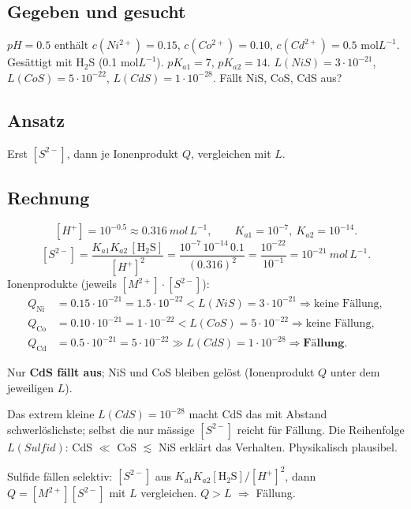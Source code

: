 
\subsection*{Gegeben und gesucht}
$pH=0.5$ enthält $c(Ni^{2+})=0.15$, $c(Co^{2+})=0.10$, $c(Cd^{2+})=0.5$
mol$L^{-1}$. Gesättigt mit H$_2$S (0.1 mol$L^{-1}$).
$pK_{a1}=7$, $pK_{a2}=14$. $L(NiS)=3\cdot10^{-21}$, $L(CoS)=5\cdot10^{-22}$,
$L(CdS)=1\cdot10^{-28}$. Fällt NiS, CoS, CdS aus?

\subsection*{Ansatz}
Erst $[S^{2-}]$, dann je Ionenprodukt $Q$, vergleichen mit $L$.

\subsection*{Rechnung}
\[
  [H^+] = 10^{-0.5} \approx 0.316\ mol\,L^{-1},\qquad
  K_{a1}=10^{-7},\ K_{a2}=10^{-14}.
\]
\[
  [S^{2-}] = \frac{K_{a1}K_{a2}\,[\mathrm{H_2S}]}{[H^+]^2}
    = \frac{10^{-7}\,10^{-14}\,0.1}{ (0.316)^2}
    = \frac{10^{-22}}{10^{-1}} = 10^{-21}\ mol\,L^{-1}.
\]
Ionenprodukte (jeweils $[M^{2+}]\cdot[S^{2-}]$):
\begin{align*}
  Q_{\text{Ni}} &= 0.15\cdot10^{-21} = 1.5\cdot10^{-22} < L(NiS)=3\cdot10^{-21}
    \Rightarrow \text{keine Fällung},\\
  Q_{\text{Co}} &= 0.10\cdot10^{-21} = 1\cdot10^{-22} < L(CoS)=5\cdot10^{-22}
    \Rightarrow \text{keine Fällung},\\
  Q_{\text{Cd}} &= 0.5\cdot10^{-21} = 5\cdot10^{-22} \gg L(CdS)=1\cdot10^{-28}
    \Rightarrow \textbf{Fällung}.
\end{align*}

\begin{ergebnis}
Nur \textbf{CdS fällt aus}; NiS und CoS bleiben gelöst (Ionenprodukt $Q$
unter dem jeweiligen $L$).
\end{ergebnis}

\begin{kontrolle}
Das extrem kleine $L(CdS)=10^{-28}$ macht CdS das mit Abstand
schwerlöslichste; selbst die nur mässige $[S^{2-}]$ reicht für Fällung.
Die Reihenfolge $L(Sulfid)$: CdS $\ll$ CoS $\lesssim$ NiS erklärt das
Verhalten. Physikalisch plausibel.
\end{kontrolle}

\begin{merksatz}
Sulfide fällen selektiv: $[S^{2-}]$ aus $K_{a1}K_{a2}[\mathrm{H_2S}]/[H^+]^2$,
dann $Q=[M^{2+}][S^{2-}]$ mit $L$ vergleichen. $Q>L$ $\Rightarrow$
Fällung.
\end{merksatz}
